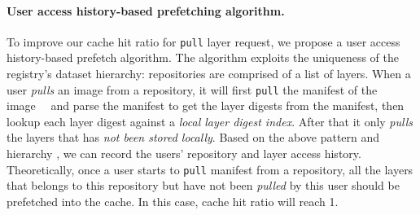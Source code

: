 \paragraph{User access history-based prefetching algorithm.}
To improve our cache hit ratio for \texttt{pull} layer request, we propose a user access history-based prefetch algorithm. The algorithm
exploits the uniqueness of the registry's 
dataset hierarchy: repositories are comprised of a list of layers.
When a user \emph{pulls} an image from a repository, it will first \texttt{pull} the manifest of the image~\cite{docker}~\cite{dockerworkload} and 
parse the manifest to get the layer digests from the manifest,
then lookup each layer digest against a \emph{local layer digest index}.
After that it only \emph{pulls} the layers that has \emph{not been stored locally}.
%
Based on the above 
pattern and hierarchy 
, we can record the users' repository and layer access history. 
Theoretically, once a user starts to \texttt{pull} manifest from a repository, all the layers that belongs to this repository but have not been \emph{pulled} by this user should be prefetched into the cache.
In this case, cache hit ratio will reach 1.


